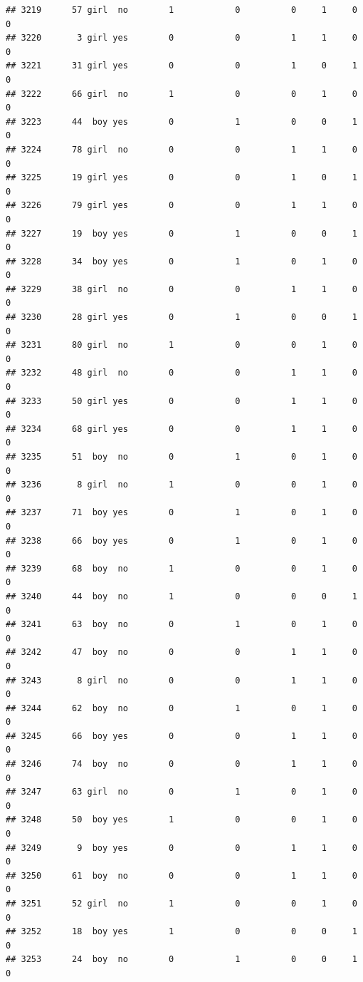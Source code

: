 \documentclass[man]{apa6}
\begin{document}
\begin{verbatim}
## 3219      57 girl  no        1            0          0     1     0     0
## 3220       3 girl yes        0            0          1     1     0     0
## 3221      31 girl yes        0            0          1     0     1     0
## 3222      66 girl  no        1            0          0     1     0     0
## 3223      44  boy yes        0            1          0     0     1     0
## 3224      78 girl  no        0            0          1     1     0     0
## 3225      19 girl yes        0            0          1     0     1     0
## 3226      79 girl yes        0            0          1     1     0     0
## 3227      19  boy yes        0            1          0     0     1     0
## 3228      34  boy yes        0            1          0     1     0     0
## 3229      38 girl  no        0            0          1     1     0     0
## 3230      28 girl yes        0            1          0     0     1     0
## 3231      80 girl  no        1            0          0     1     0     0
## 3232      48 girl  no        0            0          1     1     0     0
## 3233      50 girl yes        0            0          1     1     0     0
## 3234      68 girl yes        0            0          1     1     0     0
## 3235      51  boy  no        0            1          0     1     0     0
## 3236       8 girl  no        1            0          0     1     0     0
## 3237      71  boy yes        0            1          0     1     0     0
## 3238      66  boy yes        0            1          0     1     0     0
## 3239      68  boy  no        1            0          0     1     0     0
## 3240      44  boy  no        1            0          0     0     1     0
## 3241      63  boy  no        0            1          0     1     0     0
## 3242      47  boy  no        0            0          1     1     0     0
## 3243       8 girl  no        0            0          1     1     0     0
## 3244      62  boy  no        0            1          0     1     0     0
## 3245      66  boy yes        0            0          1     1     0     0
## 3246      74  boy  no        0            0          1     1     0     0
## 3247      63 girl  no        0            1          0     1     0     0
## 3248      50  boy yes        1            0          0     1     0     0
## 3249       9  boy yes        0            0          1     1     0     0
## 3250      61  boy  no        0            0          1     1     0     0
## 3251      52 girl  no        1            0          0     1     0     0
## 3252      18  boy yes        1            0          0     0     1     0
## 3253      24  boy  no        0            1          0     0     1     0

\end{verbatim}
\end{document}
